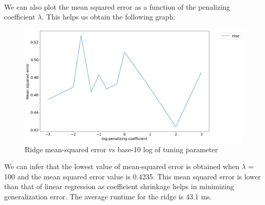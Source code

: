 \documentclass[a4paper,12pt]{article}
\begin{document}
\\
\noindent We can also plot the mean squared error as a function of the penalizing coefficient $\lambda$. This helps us obtain the following graph:
\begin{figure}[H]
            \centering
            \includegraphics[scale=0.3]{mse-lambda-ridge.png}
            \caption{Ridge mean-squared error vs base-10 log of tuning parameter}
\end{figure}
\noindent We can infer that the lowest value of mean-squared error is obtained when $\lambda$ = 100 and the mean squared error value is 0.4235. This mean squared error is lower than that of linear regression as coefficient shrinkage helps in minimizing generalization error. The average runtime for the ridge is 43.1 ms.

		\newpage
\end{document}
